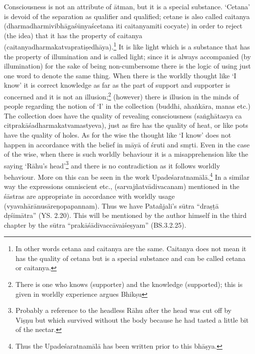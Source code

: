 Consciousness is not an attribute of ātman, but it is a special substance. ‘Cetana’ is devoid of the separation as qualifier and qualified; cetane is also called caitanya (dharmadharmivibhāgaśūnyaścetana iti caitanyamiti cocyate) in order to reject (the idea) that it has the property of caitanya (caitanyadharmakatvapratiṣedhāya).\footnote{In other words cetana and caitanya are the same. Caitanya does not mean it has the quality of cetana but is
a special substance and can be called cetana or caitanya.} It is like light which is a substance that has the property of illumination and is called light; since it is always accompanied (by illumination) for the sake of being non-cumbersome there is the logic of using just one word to denote the same thing. When there is the worldly thought like ‘I know’ it is correct knowledge as far as the part of support and supporter is concerned and it is not an illusion;\footnote{There is one who knows (supporter) and the knowledge (supported); this is given in worldly experience argues Bhikṣu} (however) there is illusion in the minds of people regarding the notion of ‘I’ in the collection (buddhi, ahaṅkāra,  manas etc.) The collection does have the quality of revealing consciousness (saṅghātasya ca citprakāśadharmakatvamastyeva), just as fire has the quality of heat, or like pots have the quality of holes. As for the wise the thought like ‘I know’ does not happen in accordance with the belief in māyā of śruti and smṛti. Even in the case of the wise, when there is such worldly behaviour it is a misapprehension like the saying ‘Rāhu’s head’\footnote{Probably a reference to the headless Rāhu after the head was cut off by Viṣṇu but which survived without the body because he had tasted a little bit of the nectar.} and  there is no contradiction as it follows worldly behaviour. More on this can be seen in the work Upadeśaratnamālā.\footnote{Thus the Upadeśaratnamālā has been written prior to this bhāṣya.} In a similar way the expressions omniscient etc., (sarvajñatvādivacanam) mentioned in the śāstras are appropriate in accordance with worldly usage (vyavahārānusāreṇopapannam). Thus we have Patañjali’s sūtra “draṣṭā dṛśimātra” (YS. 2.20). This will be mentioned by the author himself in the third chapter by the sūtra “prakāśādivaccāvaiśeṣyam” (BS.3.2.25).

